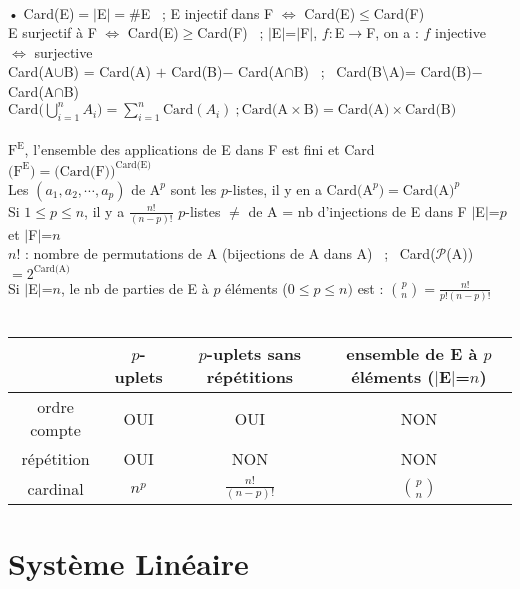 \documentclass[12 pt]{book}
\begin{document}
\begin{flushleft}
\begin{doublespace}
	\text{}\\
	• Card(E)$=|$E$|=\#$E \ ; E injectif dans F $\Leftrightarrow$ Card(E)$\leq$Card(F)\\
	 E surjectif à F $\Leftrightarrow$ Card(E)$\geq$Card(F) \ ; $|$E$|$=$|$F$|$, $f:$E$\rightarrow$F, on a : $f$ injective $\Leftrightarrow$ surjective\\
	 Card(A$\cup$B) = Card(A) $+$ Card(B)$-$ Card(A$\cap$B) \ ; \ Card(B\textbackslash A)= Card(B)$-$ Card(A$\cap$B)\\ 
	 $\text{Card}\Big(\bigcup_{i=1}^n A_i \Big)= \sum\limits_{i=1}^n \text{Card}(A_i) \ ;  \text{Card(A}\times \text{B}) = \text{Card(A)}\times \text{Card(B)}$\\
	 \text{}\\
	 $\text{F}^\text{E}$, l'ensemble des applications de E dans F est fini et Card$\big(\text{F}^\text{E}\big) = \big( \text{Card(F)} \big)^\text{Card(E)}$\\
	 Les $(a_1,a_2,\cdots ,a_p)$ de $\text{A}^p$ sont les $p$-listes, il y en a Card$\big(\text{A}^p\big) = \text{Card(A)}^p$\\
	 Si $1\leq p \leq n$, il y a $\frac{n!}{(n-p)!}$ $p$-listes $\ne$ de A = nb d'injections de E dans F $|$E$|$=$p$ et $|$F$|$=$n$\\
	$n!$ : nombre de permutations de A (bijections de A dans A)  \ ; \ Card($\mathcal{P}$(A))$= 2^{\text{Card(A)}}$\\
	Si $|$E$|$=$n$, le nb de parties de E à $p$ éléments ($0\leq p \leq n)$ est : $\binom{p}{n} = \frac{n!}{p! (n-p)!}$\\
	\text{}\\
	\begin{tabular}{|c|c|c|c|}
		\cline{2-4}
		 \multicolumn{1}{c|}{} & $p$-uplets & $p$-uplets sans répétitions & ensemble de E à $p$ éléments ($|$E$|$=$n$)  \\
		\hline
		ordre compte & OUI & OUI & NON \\ 
		\hline
		répétition & OUI & NON & NON \\
		\hline
		cardinal & $n^p$ & $\frac{n!}{(n-p)!}$ & $\binom{p}{n}$\\
		\hline
	\end{tabular}

\end{doublespace}
\end{flushleft}

\section*{Système Linéaire}
\end{document}
